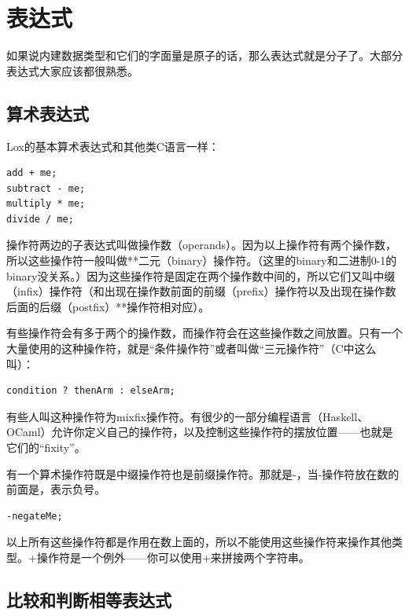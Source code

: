 \documentclass[cn,10pt,math=newtx,citestyle=gb7714-2015,bibstyle=gb7714-2015]{elegantbook}
\begin{document}
\section{表达式}

如果说内建数据类型和它们的字面量是原子的话，那么表达式就是分子了。大部分表达式大家应该都很熟悉。

\subsection{算术表达式}

Lox的基本算术表达式和其他类C语言一样：

\begin{verbatim}
add + me;
subtract - me;
multiply * me;
divide / me;
\end{verbatim}

操作符两边的子表达式叫做操作数（operands）。因为以上操作符有两个操作数，所以这些操作符一般叫做**二元（binary）操作符。（这里的binary和二进制0-1的binary没关系。）因为这些操作符是固定在两个操作数中间的，所以它们又叫中缀（infix）操作符（和出现在操作数前面的前缀（prefix）操作符以及出现在操作数后面的后缀（postfix）**操作符相对应）。

\begin{tcolorbox}
有些操作符会有多于两个的操作数，而操作符会在这些操作数之间放置。只有一个大量使用的这种操作符，就是“条件操作符”或者叫做“三元操作符”（C中这么叫）：

\begin{verbatim}
condition ? thenArm : elseArm;
\end{verbatim}

有些人叫这种操作符为mixfix操作符。有很少的一部分编程语言（Haskell、OCaml）允许你定义自己的操作符，以及控制这些操作符的摆放位置——也就是它们的“fixity”。
\end{tcolorbox}

有一个算术操作符既是中缀操作符也是前缀操作符。那就是-，当-操作符放在数的前面是，表示负号。

\begin{verbatim}
-negateMe;
\end{verbatim}

以上所有这些操作符都是作用在数上面的，所以不能使用这些操作符来操作其他类型。+操作符是一个例外——你可以使用+来拼接两个字符串。

\subsection{比较和判断相等表达式}
\end{document}
